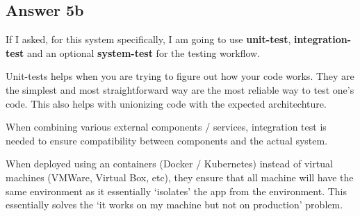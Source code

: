 \documentclass[
  11pt, %
]{assignment}
\begin{document}
\subsection*{Answer 5b}

If I asked, for this system specifically, I am going to use \textbf{unit-test}, \textbf{integration-test} and an optional \textbf{system-test} for the testing workflow.

\medskip

Unit-tests helps when you are trying to figure out how your code works. They are the simplest and most straightforward way are the most reliable way to test one's code. This also helps with unionizing code with the expected architechture.

\medskip

When combining various external components / services, integration test is needed to ensure compatibility between components and the actual system.

\medskip

When deployed using an containers (Docker / Kubernetes) instead of virtual machines (VMWare, Virtual Box, etc), they ensure that all machine will have the same environment as it essentially `isolates' the app from the environment. This essentially solves the `it works on my machine but not on production' problem.
\end{document}
